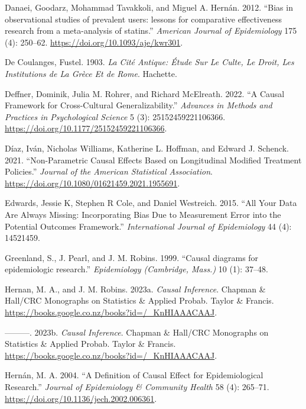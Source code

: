 \documentclass[
  singlecolumn]{report}
\newlength{\cslhangindent}
\newlength{\cslentryspacingunit} %
\newenvironment{CSLReferences}[2] %
 {%
  \setlength{\parindent}{0pt}
  \ifodd #1
  \let\oldpar\par
  \def\par{\hangindent=\cslhangindent\oldpar}
  \fi
  \setlength{\parskip}{#2\cslentryspacingunit}
 }%
 {}
\begin{document}
\begin{CSLReferences}{1}{0}
\leavevmode{}%
Danaei, Goodarz, Mohammad Tavakkoli, and Miguel A. Hernán. 2012. {``Bias
in observational studies of prevalent users: lessons for comparative
effectiveness research from a meta-analysis of statins.''}
\emph{American Journal of Epidemiology} 175 (4): 250--62.
\url{https://doi.org/10.1093/aje/kwr301}.

\leavevmode{}%
De Coulanges, Fustel. 1903. \emph{La Cité Antique: Étude Sur Le Culte,
Le Droit, Les Institutions de La Grèce Et de Rome}. Hachette.

\leavevmode{}%
Deffner, Dominik, Julia M. Rohrer, and Richard McElreath. 2022. {``A
Causal Framework for Cross-Cultural Generalizability.''} \emph{Advances
in Methods and Practices in Psychological Science} 5 (3):
25152459221106366. \url{https://doi.org/10.1177/25152459221106366}.

\leavevmode{}%
Díaz, Iván, Nicholas Williams, Katherine L. Hoffman, and Edward J.
Schenck. 2021. {``Non-Parametric Causal Effects Based on Longitudinal
Modified Treatment Policies.''} \emph{Journal of the American
Statistical Association}.
\url{https://doi.org/10.1080/01621459.2021.1955691}.

\leavevmode{}%
Edwards, Jessie K, Stephen R Cole, and Daniel Westreich. 2015. {``All
Your Data Are Always Missing: Incorporating Bias Due to Measurement
Error into the Potential Outcomes Framework.''} \emph{International
Journal of Epidemiology} 44 (4): 14521459.

\leavevmode{}%
Greenland, S., J. Pearl, and J. M. Robins. 1999. {``Causal diagrams for
epidemiologic research.''} \emph{Epidemiology (Cambridge, Mass.)} 10
(1): 37--48.

\leavevmode{}%
Hernan, M. A., and J. M. Robins. 2023a. \emph{Causal Inference}. Chapman
\& Hall/CRC Monographs on Statistics \& Applied Probab. Taylor \&
Francis. \url{https://books.google.co.nz/books?id=/_KnHIAAACAAJ}.

\leavevmode{}%
---------. 2023b. \emph{Causal Inference}. Chapman \& Hall/CRC
Monographs on Statistics \& Applied Probab. Taylor \& Francis.
\url{https://books.google.co.nz/books?id=/_KnHIAAACAAJ}.

\leavevmode{}%
Hernán, M. A. 2004. {``A Definition of Causal Effect for Epidemiological
Research.''} \emph{Journal of Epidemiology \& Community Health} 58 (4):
265--71. \url{https://doi.org/10.1136/jech.2002.006361}.


\end{CSLReferences}
\end{document}
